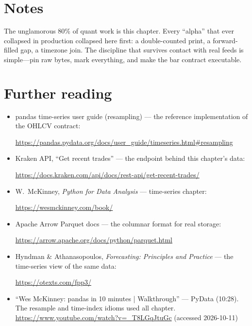 \section*{Notes}
The unglamorous 80\% of quant work is this chapter. Every ``alpha'' that ever collapsed in
production collapsed here first: a double-counted print, a forward-filled gap, a timezone
join. The discipline that survives contact with real feeds is simple---pin raw bytes, mark
everything, and make the bar contract executable.

\section*{Further reading}
\begin{itemize}
\item pandas time-series user guide (resampling) --- the reference implementation of the
OHLCV contract:

\url{https://pandas.pydata.org/docs/user_guide/timeseries.html#resampling}
\item Kraken API, ``Get recent trades'' --- the endpoint behind this chapter's data:

\url{https://docs.kraken.com/api/docs/rest-api/get-recent-trades/}
\item W.~McKinney, \emph{Python for Data Analysis} --- time-series chapter:

\url{https://wesmckinney.com/book/}
\item Apache Arrow Parquet docs --- the columnar format for real storage:

\url{https://arrow.apache.org/docs/python/parquet.html}
\item Hyndman \& Athanasopoulos, \emph{Forecasting: Principles and Practice} --- the
time-series view of the same data:

\url{https://otexts.com/fpp3/}
\end{itemize}

\begin{rulebox}
\begin{itemize}
\item ``Wes McKinney: pandas in 10 minutes | Walkthrough'' --- PyData (10:28). The resample
and time-index idioms used all chapter.
\url{https://www.youtube.com/watch?v=_T8LGqJtuGc} (accessed 2026-10-11)
\end{itemize}
\end{rulebox}
